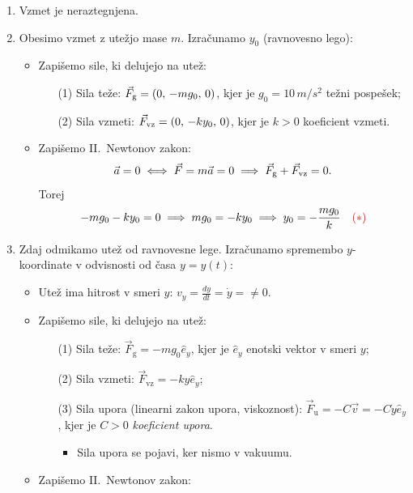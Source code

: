 \begin{enumerate}
    \item Vzmet je neraztegnjena.
    \item Obesimo vzmet z utežjo mase \(m\). Izračunamo \(y_0\) (ravnovesno lego):
    \begin{itemize}
        \item Zapišemo sile, ki delujejo na utež:
        \begin{enumerate}
            \item[(1)] Sila teže: \(\vec{F}_\text{g} = (0, \, -mg_0, \, 0)\), kjer je \(g_0 = 10 \, m / s^2\) težni pospešek;
            \item[(2)] Sila vzmeti: \(\vec{F}_\text{vz} = (0, \, -ky_0, \, 0)\), kjer je \(k > 0\) koeficient vzmeti.
        \end{enumerate}
        \item Zapišemo II.\ Newtonov zakon:
        \[
        \vec{a} = 0 \iff \vec{F} = m \vec{a} = 0 \implies \vec{F}_\text{g} + \vec{F}_\text{vz} = 0.
        \]
        Torej
        \[
        -mg_0 - ky_0 = 0 \implies mg_0 = -ky_0 \implies y_0 = -\frac{mg_0}{k} \quad \textcolor{red}{(*)}
        \]        
    \end{itemize}
    \item Zdaj odmikamo utež od ravnovesne lege. Izračunamo spremembo \(y\)-koordinate v odvisnosti od časa \(y = y(t)\):
    \begin{itemize}
        \item Utež ima hitrost v smeri \(y\): \( v_y = \frac{dy}{dt} = \dot{y} = \neq 0\).
        \item Zapišemo sile, ki delujejo na utež:
        \begin{itemize}
            \item[(1)] Sila teže: \(\vec{F}_\text{g} = -mg_0 \widehat{e}_y\), kjer je \(\widehat{e}_y\) enotski vektor v smeri \(y\); 
            \item[(2)] Sila vzmeti: \(\vec{F}_\text{vz} = -ky\widehat{e}_y\);
            \item[(3)] Sila upora (linearni zakon upora, viskoznost): \(\vec{F}_\text{u} = -C \vec{v} = -C \dot{y} \widehat{e}_y\), kjer je \(C > 0\) \emph{koeficient upora}.
            \begin{itemize}
                \item Sila upora se pojavi, ker nismo v vakuumu.
            \end{itemize}            
        \end{itemize}
        \item Zapišemo II.\ Newtonov zakon:

\end{itemize}
\end{enumerate}
